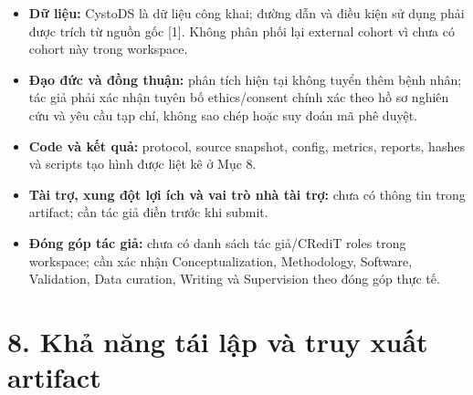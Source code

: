 \documentclass[
  10pt,
  a4paper,
  twocolumn]{article}
\providecommand{\tightlist}{%
  \setlength{\itemsep}{0pt}\setlength{\parskip}{0pt}}
\begin{document}
\begin{itemize}
\tightlist
\item
  \textbf{Dữ liệu:} CystoDS là dữ liệu công khai; đường dẫn và điều kiện
  sử dụng phải được trích từ nguồn gốc {[}1{]}. Không phân phối lại
  external cohort vì chưa có cohort này trong workspace.
\item
  \textbf{Đạo đức và đồng thuận:} phân tích hiện tại không tuyển thêm
  bệnh nhân; tác giả phải xác nhận tuyên bố ethics/consent chính xác
  theo hồ sơ nghiên cứu và yêu cầu tạp chí, không sao chép hoặc suy đoán
  mã phê duyệt.
\item
  \textbf{Code và kết quả:} protocol, source snapshot, config, metrics,
  reports, hashes và scripts tạo hình được liệt kê ở Mục 8.
\item
  \textbf{Tài trợ, xung đột lợi ích và vai trò nhà tài trợ:} chưa có
  thông tin trong artifact; cần tác giả điền trước khi submit.
\item
  \textbf{Đóng góp tác giả:} chưa có danh sách tác giả/CRediT roles
  trong workspace; cần xác nhận Conceptualization, Methodology,
  Software, Validation, Data curation, Writing và Supervision theo đóng
  góp thực tế.
\end{itemize}

\section{8. Khả năng tái lập và truy xuất
artifact}\label{khux1ea3-nux103ng-tuxe1i-lux1eadp-vuxe0-truy-xuux1ea5t-artifact}
\end{document}
